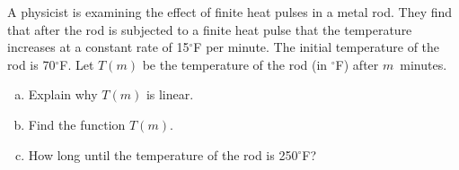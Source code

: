 \documentclass[12pt,letterpaper]{exam}
\begin{document}
\begin{questions}
\newpage
\question[15] A physicist is examining the effect of finite heat pulses in a metal rod. They find that after the rod is subjected to a finite heat pulse that the temperature increases at a constant rate of 15$^\circ$F per minute. The initial temperature of the rod is 70$^\circ$F. Let $T(m)$ be the temperature of the rod (in $^\circ$F) after $m$~minutes. 
	\begin{enumerate}[(a)]
	\item Explain why $T(m)$ is linear. \vfill
	\item Find the function $T(m)$. \vfill
	\item How long until the temperature of the rod is 250$^\circ$F? \vfill
	\end{enumerate}

\end{questions}
\end{document}
